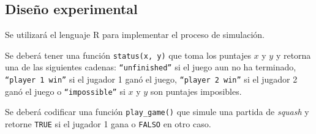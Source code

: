 \documentclass[11pt,letterpaper]{scrartcl}
\begin{document}
		\subsection{Diseño experimental}
		Se utilizará el lenguaje R para implementar el proceso de simulación.
		
		Se deberá tener una función \texttt{status(x, y)} que toma los puntajes $x$ y $y$ y retorna una de las siguientes cadenas: \texttt{``unfinished''} si el juego aun no ha terminado, \texttt{``player 1 win''} si el jugador 1 ganó el juego, \texttt{``player 2 win''} si el jugador 2 ganó el juego o \texttt{``impossible''} si $x$ y $y$ son puntajes imposibles.
		
		Se deberá codificar una función \texttt{play\_game()} que simule una partida de \textit{squash} y retorne \texttt{TRUE} si el jugador 1 gana o \texttt{FALSO} en otro caso.
	
	
	
	
\end{document}
